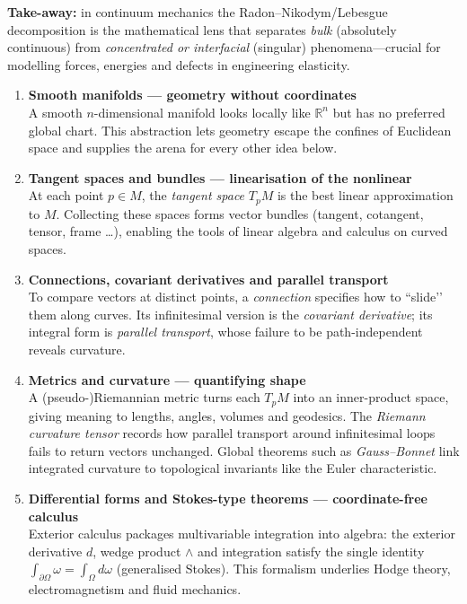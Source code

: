\documentclass[12pt]{article}
\theoremstyle{definition} %
\theoremstyle{plain} %
\begin{document}
\medskip
\noindent\textbf{Take-away:}
in continuum mechanics the Radon–Nikodym/Lebesgue decomposition is the
mathematical lens that separates \emph{bulk} (absolutely continuous) from
\emph{concentrated or interfacial} (singular) phenomena—crucial for modelling
forces, energies and defects in engineering elasticity.
\pagebreak
\begin{enumerate}
  \item \textbf{Smooth manifolds — geometry without coordinates}\\
        A smooth $n$-dimensional manifold looks locally like $\mathbb{R}^{n}$ but has no preferred global chart.  
        This abstraction lets geometry escape the confines of Euclidean space and supplies the arena for every other idea below.

  \item \textbf{Tangent spaces and bundles — linearisation of the nonlinear}\\
        At each point $p\in M$, the \emph{tangent space} $T_{p}M$ is the best linear approximation to $M$.  
        Collecting these spaces forms vector bundles (tangent, cotangent, tensor, frame …), enabling the tools of linear algebra and calculus on curved spaces.

  \item \textbf{Connections, covariant derivatives and parallel transport}\\
        To compare vectors at distinct points, a \emph{connection} specifies how to “slide’’ them along curves.  
        Its infinitesimal version is the \emph{covariant derivative}; its integral form is \emph{parallel transport}, whose failure to be path-independent reveals curvature.

  \item \textbf{Metrics and curvature — quantifying shape}\\
        A (pseudo-)Riemannian metric turns each $T_{p}M$ into an inner-product space, giving meaning to lengths, angles, volumes and geodesics.  
        The \emph{Riemann curvature tensor} records how parallel transport around infinitesimal loops fails to return vectors unchanged.  
        Global theorems such as \emph{Gauss–Bonnet} link integrated curvature to topological invariants like the Euler characteristic.

  \item \textbf{Differential forms and Stokes-type theorems — coordinate-free calculus}\\
        Exterior calculus packages multivariable integration into algebra: the exterior derivative $d$, wedge product $\wedge$ and integration satisfy the single identity  
        $\displaystyle \int_{\partial\Omega}\!\omega = \int_{\Omega} d\omega$  
        (generalised Stokes).  This formalism underlies Hodge theory, electromagnetism and fluid mechanics.


\end{enumerate}
\end{document}

